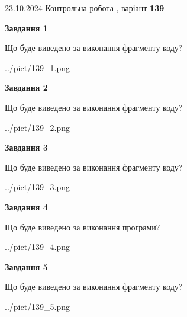 \documentclass[12pt, ukrainian]{article}
\begin{document}
{\Large{23.10.2024 Контрольна робота , варіант  \No \textbf { 139 }\par}}
{
\begin {large}
{\begin {center}\textbf{Завдання 1}\end {center}}

Що буде виведено за виконання фрагменту коду?\par
\begin{center}
	{../pict/139_1.png}
\end{center}
\newpage

{\begin {center}\textbf{Завдання 2}\end {center}}

Що буде виведено за виконання фрагменту коду?\par
\begin{center}
	{../pict/139_2.png}
\end{center}
\newpage

{\begin {center}\textbf{Завдання 3}\end {center}}

Що буде виведено за виконання фрагменту коду?\par
\begin{center}
	{../pict/139_3.png}
\end{center}
\newpage

{\begin {center}\textbf{Завдання 4}\end {center}}

Що буде виведено за виконання програми?\par
\begin{center}
	{../pict/139_4.png}
\end{center}
\newpage

{\begin {center}\textbf{Завдання 5}\end {center}}

Що буде виведено за виконання фрагменту коду?\par
\begin{center}
	{../pict/139_5.png}
\end{center}
\newpage


\end{large}}
\end{document}
